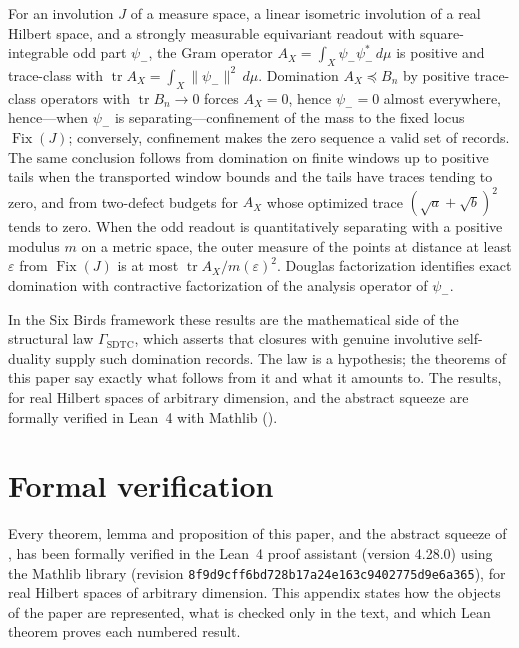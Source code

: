 \documentclass[11pt]{article}
\DeclareMathOperator{\Fix}{Fix}
\DeclareMathOperator{\trace}{tr}
\newcommand{\psim}{\psi_{-}}
\newcommand{\AX}{A_{X}}
\newcommand{\GamSDTC}{\Gamma_{\mathrm{SDTC}}}
\theoremstyle{definition}
\begin{document}
For an involution \(J\) of a measure space, a linear isometric
involution of a real Hilbert space, and a strongly measurable
equivariant readout with square-integrable odd part \(\psim\), the Gram operator
\(\AX=\int_X\psim\psim^*\,d\mu\) is positive and trace-class with
\(\trace\AX=\int_X\|\psim\|^2\,d\mu\).  Domination
\(\AX\preceq B_n\) by positive trace-class operators with
\(\trace B_n\to0\) forces \(\AX=0\), hence \(\psim=0\) almost
everywhere, hence---when \(\psim\) is separating---confinement of the
mass to the fixed locus \(\Fix(J)\); conversely, confinement makes the
zero sequence a valid set of records.  The same conclusion follows from
domination on finite windows up to positive tails when the transported
window bounds and the tails have traces tending to zero, and from
two-defect budgets for \(\AX\) whose optimized trace
\((\sqrt a+\sqrt b)^2\) tends to zero.  When the odd readout is
quantitatively separating with a positive modulus \(m\) on a metric
space, the outer measure of the points at distance at least
\(\varepsilon\) from \(\Fix(J)\) is at most
\(\trace\AX/m(\varepsilon)^2\).  Douglas factorization identifies exact
domination with contractive factorization of the analysis operator of
\(\psim\).

In the Six Birds framework these results are the mathematical side of
the structural law \(\GamSDTC\), which asserts that closures with
genuine involutive self-duality supply such domination records.  The
law is a hypothesis; the theorems of this paper say exactly what
follows from it and what it amounts to.  The results, for real Hilbert spaces of arbitrary dimension, and the
abstract squeeze are formally verified in Lean~4 with Mathlib
().

\appendix
{}
\section{Formal verification}
\label{app:formalization}

Every theorem, lemma and proposition of this paper, and the abstract
squeeze of , has been
formally verified in the Lean~4 proof assistant (version 4.28.0) using
the Mathlib library (revision
\nolinkurl{8f9d9cff6bd728b17a24e163c9402775d9e6a365}), for real Hilbert
spaces of arbitrary dimension.  This appendix states how the objects of
the paper are represented, what is checked only in the text, and which
Lean theorem proves each numbered result.
\end{document}
